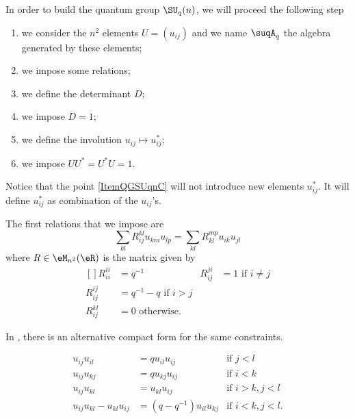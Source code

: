 In order to build the quantum group $\SU_q(n)$, we will proceed the following step\cite{Koelink}
\begin{enumerate}
    \item
        we consider the $n^2$ elements $U=(u_{ij})$ and we name $\suqA_q$ the algebra generated by these elements;
    \item
        we impose some relations;
    \item
        we define the determinant $D$;
    \item
        we impose $D=1$;
    \item\label{ItemQGSUqnC}
        we define the involution $u_{ij}\mapsto u_{ij}^*$;
    \item
        we impose $UU^*=U^*U=1$.
        
\end{enumerate}
Notice that the point \ref{ItemQGSUqnC} will not introduce new elements $u_{ij}^*$. It will define $u_{ij}^*$ as combination of the $u_{ij}$'s.

The first relations that we impose are
\begin{equation}        \label{EqRelsSUqnAvecR}
    \sum_{kl}R^{kl}_{ij}u_{km}u_{lp}=\sum_{kl}R^{mp}_{kl}u_{ik}u_{jl}
\end{equation}
where $R\in\eM_{n^2}(\eR)$ is the matrix given by
\begin{equation}
    \begin{aligned}[]
        R_{ii}^{ii}&=q^{-1}&R_{ij}^{ji}&=1\text{ if }i\neq j\\
        R_{ij}^{ij}&=q^{-1}-q\text{ if }i>j\\
        R_{ij}^{kl}&=0\text{ otherwise}.
    \end{aligned}
\end{equation}

\begin{remark}
    In \cite{Bragiel}, there is an alternative compact form for the same constraints.
\end{remark}

\begin{proposition}
    \begin{subequations}        \label{SUBEquuijcondiv}
        \begin{align}
            u_{ij}u_{il}&=qu_{il}u_{ij}&\text{if }j<l         \label{subEquuijcondi} \\
            u_{ij}u_{kj}&=qu_{kj}u_{ij}&\text{if }i<k\label{subEquuijcondii}\\
            u_{ij}u_{kl}&=u_{kl}u_{ij}&\text{if }i>k,j<l\label{subEquuijcondiii}\\
            u_{ij}u_{kl}-u_{kl}u_{ij}&=(q-q^{-1})u_{il}u_{kj}&\text{if }i<k,j<l\label{subEquuijcondiv}.
        \end{align}
    \end{subequations}
\end{proposition}

